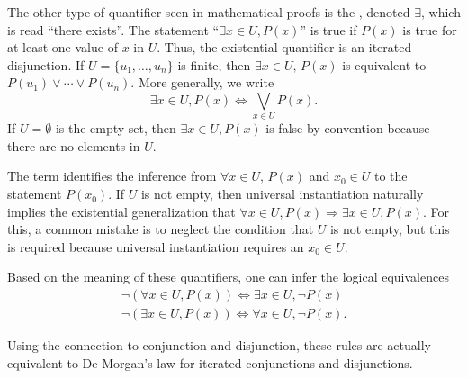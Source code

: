 The other type of quantifier seen in mathematical proofs is the , denoted $\exists$, which is read ``there exists''.
The statement ``$\exists x \in U, P(x)$'' is true if $P(x)$ is true for at least one value of $x$ in $U$.
Thus, the existential quantifier is an iterated disjunction.
If $U=\{u_1,\ldots,u_n\}$ is finite, then $\exists x\in U,\,P(x)$ is equivalent to $P(u_1)\vee\cdots\vee P(u_n)$.
More generally, we write
\[ \exists x \in U, P(x) \Leftrightarrow \bigvee_{x\in U} P(x). \]
If $U=\emptyset$ is the empty set, then $\exists x \in U, P(x)$ is false by convention because there are no elements in $U$.

The term  identifies the inference from $\forall x\in U,\,P(x)$ and $x_0 \in U$ to the statement $P(x_0)$.
If $U$ is not empty, then universal instantiation naturally implies the existential generalization that $\forall x\in U, P(x) \Rightarrow \exists x\in U, P(x)$.
For this, a common mistake is to neglect the condition that $U$ is not empty, but this is required because universal instantiation requires an $x_0 \in U$.

Based on the meaning of these quantifiers, one can infer the logical equivalences
\begin{gather*}
\neg \left( \forall x \in U, P(x) \right)
\Leftrightarrow \exists x \in U, \neg P(x) \\
\neg \left( \exists x \in U,  P(x) \right)
\Leftrightarrow \forall x \in U,  \neg P(x) .
\end{gather*}

Using the connection to conjunction and disjunction, these rules are actually equivalent to De Morgan's law for iterated conjunctions and disjunctions.


